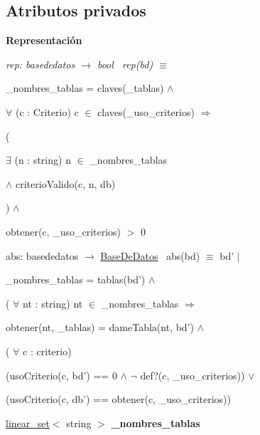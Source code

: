 \subsection*{Atributos privados}
\begin{Indent}{\bf Representación}\par
{\em rep\+: basededatos $\to$ bool~\newline
rep(bd) $\equiv$
\begin{DoxyItemize}
\item \+\_\+nombres\+\_\+tablas = claves(\+\_\+tablas) $\land$
\item $\forall$ (c \+: Criterio) c $\in$ claves(\+\_\+uso\+\_\+criterios) $\Rightarrow$
\begin{DoxyItemize}
\item (
\begin{DoxyItemize}
\item $\exists$ (n \+: string) n $\in$ \+\_\+nombres\+\_\+tablas
\item $\land$ criterio\+Valido(c, n, db)
\end{DoxyItemize}
\item ) $\land$
\item obtener(c, \+\_\+uso\+\_\+criterios) $>$ 0
\end{DoxyItemize}
\end{DoxyItemize}

abs\+: basededatos $\to$ \hyperlink{classBaseDeDatos}{Base\+De\+Datos}~\newline
abs(bd) $\equiv$ bd' $|$
\begin{DoxyItemize}
\item \+\_\+nombres\+\_\+tablas = tablas(bd') $\land$
\item ( $\forall$ nt \+: string) nt $\in$ \+\_\+nombres\+\_\+tablas $\Rightarrow$
\begin{DoxyItemize}
\item obtener(nt, \+\_\+tablas) = dame\+Tabla(nt, bd') $\land$
\end{DoxyItemize}
\item ( $\forall$ c \+: criterio)
\begin{DoxyItemize}
\item (uso\+Criterio(c, bd') == 0 $\land$ $\lnot$ def?(c, \+\_\+uso\+\_\+criterios)) $\lor$
\item (uso\+Criterio(c, db') == obtener(c, \+\_\+uso\+\_\+criterios)) 
\end{DoxyItemize}
\end{DoxyItemize}}\begin{DoxyCompactItemize}
\item 
\hypertarget{classBaseDeDatos_ae93f3d0a8d138e5742c52b9f2294d2bd}{\hyperlink{classlinear__set}{linear\+\_\+set}$<$ string $>$ {\bfseries \+\_\+nombres\+\_\+tablas}}\label{classBaseDeDatos_ae93f3d0a8d138e5742c52b9f2294d2bd}


\end{DoxyCompactItemize}
\end{Indent}
